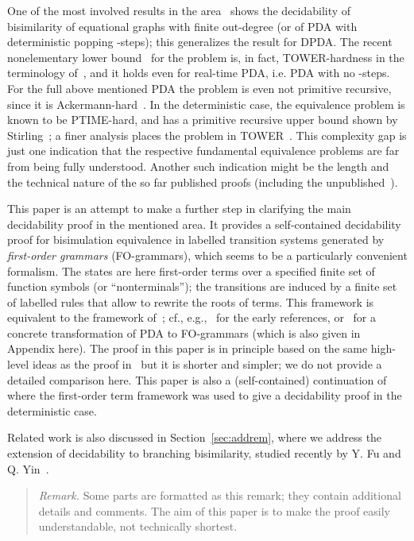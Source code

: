 \documentclass{llncs}
\begin{document}
One of the most involved results in the area~\cite{Seni05}
shows the decidability of bisimilarity
of equational graphs with finite out-degree
(or of PDA with deterministic popping
-steps); this generalizes the result for DPDA.
The recent nonelementary lower bound~\cite{BGKM12} for the problem
is, in fact, TOWER-hardness in the terminology
of~\cite{Schmitz2013}, and it holds
even for real-time PDA, i.e. PDA with no -steps. 
For the full above mentioned PDA 
the 
problem is even not primitive recursive, 
since it is Ackermann-hard~\cite{DBLP:conf/fossacs/Jancar14}.
In the deterministic case, the equivalence problem is known to be
PTIME-hard, and
has a primitive recursive upper bound shown 
by Stirling~\cite{Stir:DPDA:prim}; a finer analysis places
the problem in TOWER~\cite{DBLP:conf/fossacs/Jancar14}.
This complexity gap is just one indication that the respective
fundamental equivalence problems are far from being fully understood.
Another such indication might be the length and 
the technical nature of the so
far published proofs (including the unpublished~\cite{stirling-pda-00}).

This paper is an attempt to make a further step 
in clarifying the main decidability proof in the mentioned area.
It provides
a self-contained
decidability proof for bisimulation equivalence 
in labelled transition systems generated by \emph{first-order
grammars} (FO-grammars), which seems to be a particularly convenient
formalism. The states 
are here first-order terms over a
specified finite set of function symbols (or ``nonterminals''); the
transitions are induced by 
a finite set
of labelled rules that allow to rewrite the roots of terms.
This framework 
is equivalent
to the framework of~\cite{Seni05}; cf., e.g.,~\cite{CourcelleHandbook}
for the early references, or~\cite{JancarLICS12}
for a concrete transformation of PDA 
to FO-grammars (which is also given 
in Appendix here). 
The proof in this paper
is in principle based on the same high-level ideas as the proof
in~\cite{Seni05} but it is 
shorter and simpler; 
we do not provide a detailed comparison here.
This paper is also a (self-contained) continuation of~\cite{JancarLICS12}
where the first-order
term framework was used to give
a decidability proof in the deterministic case.


Related work is also discussed in
Section~\ref{sec:addrem}, where we address the extension of 
decidability to
branching bisimilarity, studied recently  
by Y. Fu and Q. Yin~\cite{yuxi-pdadecid-14}.

\begin{quote}
	{\small
		\emph{Remark.} Some parts are formatted as this
		remark; they contain additional details and comments.
		The aim of this paper
		is to make
		the proof easily understandable, not technically
		shortest.
	}
\end{quote}
\end{document}
